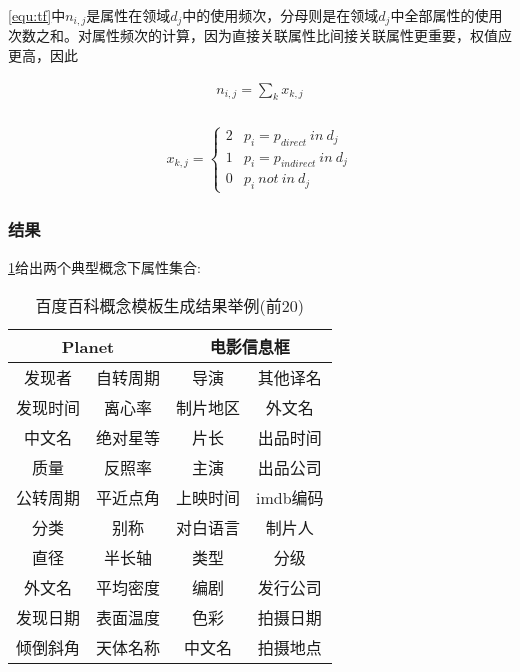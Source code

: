 \ref{equ:tf}中$n_{i,j}$是属性在领域$d_{j}$中的使用频次，分母则是在领域$d_{j}$中全部属性的使用次数之和。对属性频次的计算，因为直接关联属性比间接关联属性更重要，权值应更高，因此

\begin{align}
n_{i,j} = {\sum_{k}{x_{k,j}}}\\
\end{align}

\begin{align}
x_{k,j} =
\left\{\begin{matrix}
2 & p_i = p_{direct} \ in \ d_j\\
1 & p_i = p_{indirect} \ in \ d_j\\
0 & p_i \ not \ in \ d_j
\end{matrix}\right.
\end{align}

\subsubsection{结果}
\ref{tab:baidu-template-examples}给出两个典型概念下属性集合:

\begin{table}[htb]
  \centering
  \caption{百度百科概念模板生成结果举例(前20)}
  \label{tab:baidu-template-examples}
    \begin{tabular}{cccc}
      \toprule[1.5pt]
         \multicolumn{2}{c}{Planet} & \multicolumn{2}{c}{电影信息框}\\ \midrule[1pt]
         发现者   &  自转周期  & 导演     & 其他译名 \\
         发现时间 &  离心率    & 制片地区 & 外文名   \\
         中文名   &  绝对星等  & 片长     & 出品时间 \\
         质量     &  反照率    & 主演     & 出品公司 \\
         公转周期 &  平近点角  & 上映时间 & imdb编码 \\
         分类     &  别称      & 对白语言 & 制片人   \\
         直径     &  半长轴    & 类型     & 分级     \\
         外文名   &  平均密度  & 编剧     & 发行公司 \\
         发现日期 &  表面温度  & 色彩     & 拍摄日期 \\
         倾倒斜角 &  天体名称  & 中文名   & 拍摄地点 \\
      \bottomrule[1.5pt]
    \end{tabular}
\end{table}


